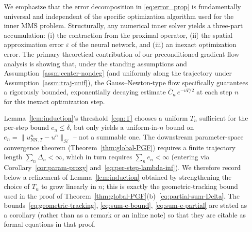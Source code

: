 \documentclass[twoside,11pt]{article}
\newcommand{\NN}{\mathrm{NN}}
\newcommand{\calH}{\mathcal{H}}
\begin{document}
\begin{remark}\label{rem:universal_decomposition}
We emphasize that the error decomposition in \eqref{eq:error_prop} is fundamentally universal and independent of the specific optimization algorithm used for the inner MMS problem. Structurally, any numerical inner solver yields a three-part accumulation:
(i) the contraction from the proximal operator,
(ii) the spatial approximation error $\varepsilon$ of the neural network, and
(iii) an inexact optimization error.
The primary theoretical contribution of our preconditioned gradient flow analysis is showing that, under the standing assumptions and Assumption~\ref{assm:center-nondeg} (and uniformly along the trajectory under Assumption~\ref{assm:traj-unif}), the Gauss--Newton-type flow specifically guarantees a rigorously bounded, exponentially decaying estimate $\bar C_n\,e^{-\nu T/2}$ at each step $n$ for this inexact optimization step.
\end{remark}

Lemma~\ref{lem:induction}'s threshold~\eqref{eqn:T} chooses a uniform $T_n$ sufficient for the per-step bound $e_n\le\delta$, but only yields a uniform-in-$n$ bound on $e_n=\|u^n_{\NN,T}-u^n\|_\calH$ -- not a summable one. The downstream parameter-space convergence theorem (Theorem~\ref{thm:global-PGF}) requires a finite trajectory length $\sum_n\Delta_n<\infty$, which in turn requires $\sum_n e_n<\infty$ (entering via Corollary~\ref{cor:param-proxy} and~\eqref{eq:per-step-lambda-inf}). We therefore record below a refinement of Lemma~\ref{lem:induction} obtained by strengthening the choice of $T_n$ to grow linearly in $n$; this is exactly the geometric-tracking bound used in the proof of Theorem~\ref{thm:global-PGF}(b)~\eqref{eq:partial-sum-Delta}. The bounds~\eqref{eq:geometric-tracking}, \eqref{eq:sum-e-bound}, \eqref{eq:sum-e-partial} are stated as a corollary (rather than as a remark or an inline note) so that they are citable as formal equations in that proof.
\end{document}
